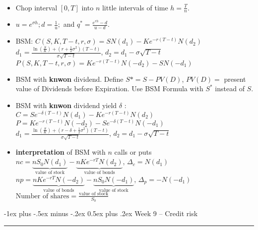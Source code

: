 \documentclass[10pt,landscape,a4paper]{article}
\makeatletter
\renewcommand{\section}{\@startsection{section}{1}{0mm}%
                                {-1ex plus -.5ex minus -.2ex}%
                                {0.5ex plus .2ex}%
                                {\normalfont\large\bfseries}}
\makeatother
\begin{document}
\begin{multicols*}{3}
\begin{description}[topsep=0pt]
	\item[Multi-step Binomial Trees] ~
	\begin{itemize}[topsep=0pt]
		\item Chop interval $[0,T]$ into $n$ little intervals of time $h=\frac{T}{n}$.
		\item $u = e^{ \sigma h} ; d= \frac{1}{u};$ and 	$q^* = \frac{e^{r h}-d}{u-d}$.
		\item BSM:  $C(S,K,T-t,r,\sigma)=S N(d_1)-Ke^{-r(T-t)}N(d_2)$ \\
		      $d_1 = \frac{\operatorname{ln}(\frac{S}{K})+(r+\frac{1}{2}\sigma^2)(T-t)}{\sigma \sqrt{T-t}}$, $d_2 = d_1 - \sigma \sqrt{T-t}$ \\
		      $P(S,K,T-t,r,\sigma)=Ke^{-r(T-t)}N(-d_2)-S N(-d_1)$ \\
		\item BSM with \textbf{knwon} dividend.  Define $S*=S-PV(D)$, $PV(D)=$ present value of Dividends before Expiration.   Use BSM Formula with $S^*$ instead of $S$.
		\item BSM with \textbf{knwon} dividend yield $\delta$ :
		  \\ $C=S e^{-\delta (T-t)}N(d_1)-Ke^{-r(T-t)}N(d_2)$ 
		  \\ $P=Ke^{-r(T-t)}N(-d_2) - S e^{-\delta (T-t)}N(-d_1)$
		  \\  $d_1 = \frac{\operatorname{ln}(\frac{S}{K})+(r-\delta+\frac{1}{2}\sigma^2)(T-t)}{\sigma \sqrt{T-t}}$, $d_2 = d_1 - \sigma \sqrt{T-t}$ 
		\item \textbf{interpretation} of BSM with $n$ calls or puts\\
		$nc = \underbrace{nS_0N(d_1)}_{\text{value of stock}}-\underbrace{nKe^{-rT}N(d_2)}_{\text{value of bonds}}$, $\Delta_c=N(d_1)
		$
		\\ $np = \underbrace{nKe^{-rT}N(-d_2)}_{\text{value of bonds}}-\underbrace{nS_0N(-d_1)}_{\text{value of stock}}$, $\Delta_p=-N(-d_1)
		$
		\\ $\text{Number of shares} = \frac{\text{value of stock}}{S_0}
		$
		
		
		
		
	\end{itemize}
\end{description}


\section{Week 9 – Credit risk}\smallskip \hrule height 1pt \smallskip


\end{multicols*}
\end{document}
